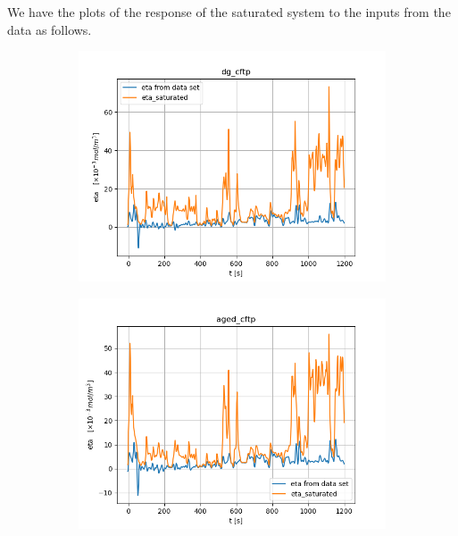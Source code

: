 We have the plots of the response of the saturated system to the inputs from the data as follows.

\begin{figure}[H]
        \begin{minipage}{0.49\textwidth}
                \begin{figure}[H]
                        \centering
                        \includegraphics[width=\textwidth]{./figs/14_figs/bounded_eta_plots/eta_bounds_dg_cftp.png}
                \end{figure}
        \end{minipage}
        \begin{minipage}{0.49\textwidth}
                \begin{figure}[H]
                        \centering
                        \includegraphics[width=\textwidth]{./figs/14_figs/bounded_eta_plots/eta_bounds_aged_cftp.png}
                \end{figure}
        \end{minipage}
\end{figure}


